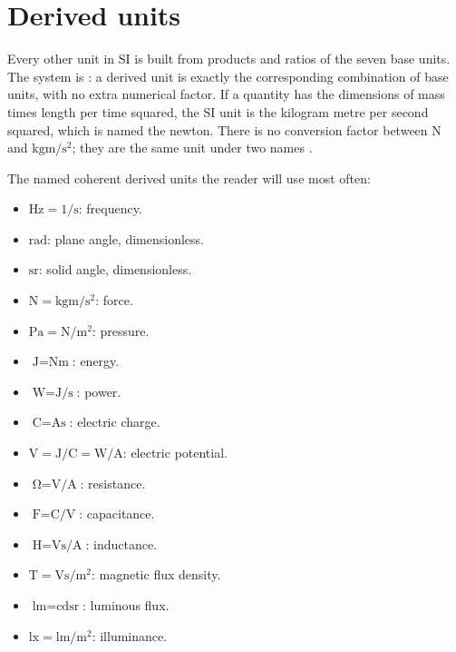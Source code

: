 \section{Derived units}

Every other unit in SI is built from products and ratios of the seven
base units. The system is : a derived unit is
exactly the corresponding combination of base units, with no extra
numerical factor. If a quantity has the dimensions of mass times
length per time squared, the SI unit is the kilogram metre per second
squared, which is named the newton. There is no conversion factor
between $\si{\newton}$ and $\si{\kilogram\meter\per\second\squared}$;
they are the same unit under two names \cite{std:bipm-si2019}.

The named coherent derived units the reader will use most often:

\begin{itemize}[leftmargin=*]
  \item $\si{\hertz} = 1/\si{\second}$: frequency.
  \item $\si{\radian}$: plane angle, dimensionless.
  \item $\si{\steradian}$: solid angle, dimensionless.
  \item $\si{\newton} = \si{\kilogram\meter\per\second\squared}$:
    force.
  \item $\si{\pascal} = \si{\newton\per\meter\squared}$: pressure.
  \item $\si{\joule} = \si{\newton\meter}$: energy.
  \item $\si{\watt} = \si{\joule\per\second}$: power.
  \item $\si{\coulomb} = \si{\ampere\second}$: electric charge.
  \item $\si{\volt} = \si{\joule\per\coulomb} = \si{\watt\per
    \ampere}$: electric potential.
  \item $\si{\ohm} = \si{\volt\per\ampere}$: resistance.
  \item $\si{\farad} = \si{\coulomb\per\volt}$: capacitance.
  \item $\si{\henry} = \si{\volt\second\per\ampere}$: inductance.
  \item $\si{\tesla} = \si{\volt\second\per\meter\squared}$: magnetic
    flux density.
  \item $\si{\lumen} = \si{\candela\steradian}$: luminous flux.
  \item $\si{\lux} = \si{\lumen\per\meter\squared}$: illuminance.
\end{itemize}


